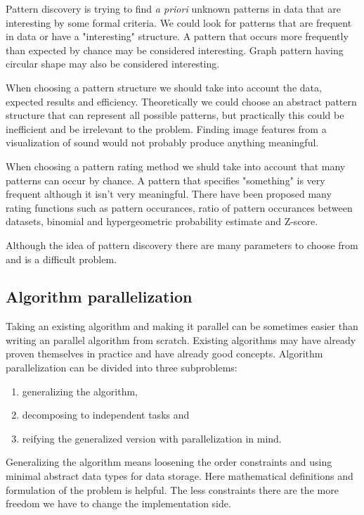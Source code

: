 Pattern discovery is trying to find \emph{a priori} unknown patterns in data that are interesting by some formal criteria. We could look for patterns that are frequent in data or have a "interesting" structure. A pattern that occurs more frequently than expected by chance may be considered interesting. Graph pattern having circular shape may also be considered interesting.

When choosing a pattern structure we should take into account the data, expected results and efficiency. Theoretically we could choose an abstract pattern structure that can represent all possible patterns, but practically this could be inefficient and be irrelevant to the problem. Finding image features from a visualization of sound would not probably produce anything meaningful.

When choosing a pattern rating method we shuld take into account that many patterns can occur by chance.  A pattern that specifies "something" is very frequent although it isn't very meaningful. There have been proposed many rating functions such as pattern occurances, ratio of pattern occurances between datasets, binomial and hypergeometric probability estimate and Z-score.

Although the idea of pattern discovery there are many parameters to choose from and is a difficult problem.

\subsection{Algorithm parallelization}

Taking an existing algorithm and making it parallel can be sometimes easier than writing an parallel algorithm from scratch. Existing algorithms may have already proven themselves in practice and have already good concepts. Algorithm parallelization can be divided into three subproblems:

\begin{enumerate}
	\item generalizing the algorithm,
	\item decomposing to independent tasks and
	\item reifying the generalized version with parallelization in mind.
\end{enumerate}

Generalizing the algorithm means loosening the order constraints and using minimal abstract data types for data storage. Here mathematical definitions and formulation of the problem is helpful. The less constraints there are the more freedom we have to change the implementation side.

